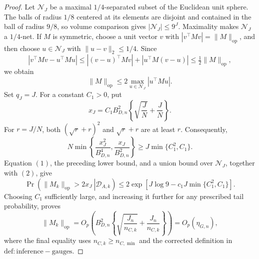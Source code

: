 \documentclass{article}
\begin{document}
\begin{proof}
Let \(\mathcal N_J\) be a maximal \(1/4\)-separated subset of the Euclidean unit sphere.  The balls of radius \(1/8\) centered at its elements are disjoint and contained in the ball of radius \(9/8\), so volume comparison gives \(|\mathcal N_J|\le 9^J\).  Maximality makes \(\mathcal N_J\) a \(1/4\)-net.  If \(M\) is symmetric, choose a unit vector \(v\) with \(|v^\top Mv|=\|M\|_{\mathrm{op}}\), and then choose \(u\in\mathcal N_J\) with \(\|u-v\|_2\le1/4\).  Since
\[
 |v^\top Mv-u^\top Mu|
 \le |(v-u)^\top Mv|+|u^\top M(v-u)|
 \le \tfrac12\|M\|_{\mathrm{op}},
\]
we obtain
\[
 \|M\|_{\mathrm{op}}\le2\max_{u\in\mathcal N_J}|u^\top Mu|. \tag{2}
\]
Set \(q_J=J\).  For a constant \(C_1>0\), put
\[
 x_J=C_1B_{D,n}^2\left\{\sqrt{\frac{J}{N}}+\frac{J}{N}\right\}.
\]
For \(r=J/N\), both \((\sqrt r+r)^2\) and \(\sqrt r+r\) are at least \(r\).  Consequently,
\[
 N\min\!\left\{\frac{x_J^2}{B_{D,n}^4},
 \frac{x_J}{B_{D,n}^2}\right\}
 \ge J\min\{C_1^2,C_1\}.
\]
Equation \((1)\), the preceding lower bound, and a union bound over \(\mathcal N_J\), together with \((2)\), give
\[
 \Pr\!\left(\left.\|M_k\|_{\mathrm{op}}>2x_J\ \right|\mathcal D_{A,k}\right)
 \le 2\exp\!\left[J\log 9-c_1J\min\{C_1^2,C_1\}\right].
\]
Choosing \(C_1\) sufficiently large, and increasing it further for any prescribed tail probability, proves
\[
 \|M_k\|_{\mathrm{op}}
 =O_p\!\left(B_{D,n}^2\left\{\sqrt{\frac{J_n}{n_{C,k}}}
 +\frac{J_n}{n_{C,k}}\right\}\right)
 =O_p(\eta_{G,n}), \tag{3}
\]
where the final equality uses \(n_{C,k}\ge n_{C,\min}\) and the corrected definition in \(\mathrm{def:inference-gauges}\).


\end{proof}
\end{document}

